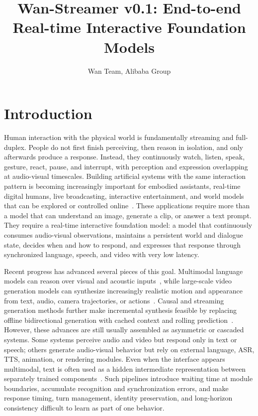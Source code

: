 \documentclass[]{style/style}
\title{Wan-Streamer v0.1: End-to-end Real-time Interactive Foundation Models}
\author[]{Wan Team, Alibaba Group}
\affiliation[]{\small See \hyperref[app:contributions-and-acknowledgements]{Contributions and Acknowledgements} for the full author list.}
\begin{document}
\maketitle

\section{Introduction}
\label{section:intro}

Human interaction with the physical world is fundamentally streaming and full-duplex. People do not first finish perceiving, then reason in isolation, and only afterwards produce a response. Instead, they continuously watch, listen, speak, gesture, react, pause, and interrupt, with perception and expression overlapping at audio-visual timescales. Building artificial systems with the same interaction pattern is becoming increasingly important for embodied assistants, real-time digital humans, live broadcasting, interactive entertainment, and world models that can be explored or controlled online~\cite{lingbotva2026,matrixgame2026,ding2025kling-avatar}. These applications require more than a model that can understand an image, generate a clip, or answer a text prompt. They require a real-time interactive foundation model: a model that continuously consumes audio-visual observations, maintains a persistent world and dialogue state, decides when and how to respond, and expresses that response through synchronized language, speech, and video with very low latency.

Recent progress has advanced several pieces of this goal. Multimodal language models can reason over visual and acoustic inputs~\cite{bai2025qwen2.5vl,team2025kimi-vl,hong2025glm4.5v}, while large-scale video generation models can synthesize increasingly realistic motion and appearance from text, audio, camera trajectories, or actions~\cite{wan2025wan,seedance2026seedance,yang2025cogvideox,ding2025kling-avatar,bai2025recammaster,matrixgame2026}. Causal and streaming generation methods further make incremental synthesis feasible by replacing offline bidirectional generation with cached context and rolling prediction~\citep{huang2025selfforcing,chen2024diffusionforcing,talkingmachines2025}. However, these advances are still usually assembled as asymmetric or cascaded systems. Some systems perceive audio and video but respond only in text or speech; others generate audio-visual behavior but rely on external language, ASR, TTS, animation, or rendering modules. Even when the interface appears multimodal, text is often used as a hidden intermediate representation between separately trained components~\cite{mavid2025,mio2025}. Such pipelines introduce waiting time at module boundaries, accumulate recognition and synchronization errors, and make response timing, turn management, identity preservation, and long-horizon consistency difficult to learn as part of one behavior.
\end{document}
